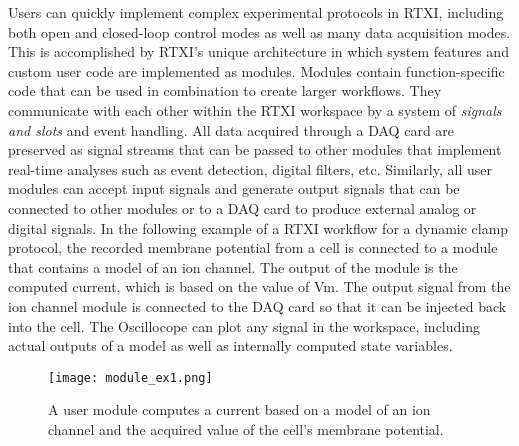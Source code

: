 Users can quickly implement complex experimental protocols in RTXI, including both open and closed-loop control modes as well as many data acquisition modes. This is accomplished by RTXI's unique architecture in which system features and custom user code are implemented as modules. Modules contain function-specific code that can be used in combination to create larger workflows. They communicate with each other within the RTXI workspace by a system of  \emph{signals and slots} and event handling. All data acquired through a DAQ card are preserved as signal streams that can be passed to other modules that implement real-time analyses such as event detection, digital filters, etc. Similarly, all user modules can accept input signals and generate output signals that can be connected to other modules or to a DAQ card to produce external analog or digital signals. In the following example of a RTXI workflow for a dynamic clamp protocol, the recorded membrane potential from a cell is connected to a module that contains a model of an ion channel. The output of the module is the computed current, which is based on the value of Vm. The output signal from the ion channel module is connected to the DAQ card so that it can be injected back into the cell. The Oscillocope can plot any signal in the workspace, including actual outputs of a model as well as internally computed state variables.

\begin{figure}[h!]
\begin{maxipage}
\begin{center}
\texttt{[image: module\_ex1.png]} 
\caption[RTXI Workflow Example 1]{A user module computes a current based on a model of an ion channel and the acquired value of the cell's membrane potential.} 
\label{fig:Workflow 1}
\end{center}
\end{maxipage}
\end{figure}

